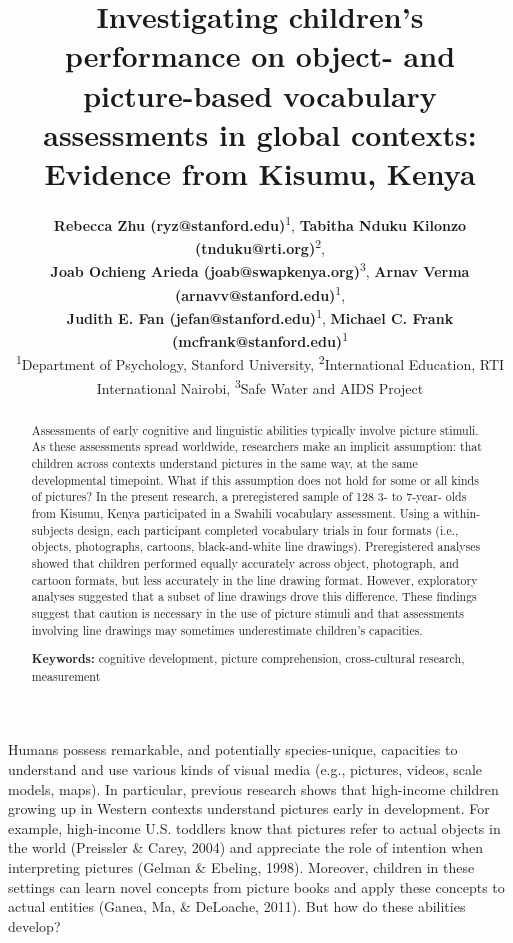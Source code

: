 \documentclass[10pt, letterpaper]{article}
\title{Investigating children's performance on object- and picture-based
vocabulary assessments in global contexts: Evidence from Kisumu, Kenya}
\author{ {\large \bf Rebecca Zhu (ryz@stanford.edu)}\textsuperscript{1}, {\large \bf Tabitha Nduku Kilonzo (tnduku@rti.org)}\textsuperscript{2}, \\ {\large \bf Joab Ochieng Arieda (joab@swapkenya.org)}\textsuperscript{3},  {\large \bf Arnav Verma (arnavv@stanford.edu)}\textsuperscript{1}, \\ {\large \bf Judith E. Fan (jefan@stanford.edu)}\textsuperscript{1}, {\large \bf Michael C. Frank (mcfrank@stanford.edu)}\textsuperscript{1}
 \\ \textsuperscript{1}Department of Psychology, Stanford University, \textsuperscript{2}International Education, RTI International Nairobi,
 \textsuperscript{3}Safe Water and AIDS Project}
\begin{document}
\maketitle

\begin{abstract}
Assessments of early cognitive and linguistic abilities typically
involve picture stimuli. As these assessments spread worldwide,
researchers make an implicit assumption: that children across contexts
understand pictures in the same way, at the same developmental
timepoint. What if this assumption does not hold for some or all kinds
of pictures? In the present research, a preregistered sample of 128 3-
to 7-year- olds from Kisumu, Kenya participated in a Swahili vocabulary
assessment. Using a within-subjects design, each participant completed
vocabulary trials in four formats (i.e., objects, photographs, cartoons,
black-and-white line drawings). Preregistered analyses showed that
children performed equally accurately across object, photograph, and
cartoon formats, but less accurately in the line drawing format.
However, exploratory analyses suggested that a subset of line drawings
drove this difference. These findings suggest that caution is necessary
in the use of picture stimuli and that assessments involving line
drawings may sometimes underestimate children's capacities.

\textbf{Keywords:}
cognitive development, picture comprehension, cross-cultural research,
measurement
\end{abstract}

Humans possess remarkable, and potentially species-unique, capacities to
understand and use various kinds of visual media (e.g., pictures,
videos, scale models, maps). In particular, previous research shows that
high-income children growing up in Western contexts understand pictures
early in development. For example, high-income U.S. toddlers know that
pictures refer to actual objects in the world (Preissler \& Carey, 2004)
and appreciate the role of intention when interpreting pictures (Gelman
\& Ebeling, 1998). Moreover, children in these settings can learn novel
concepts from picture books and apply these concepts to actual entities
(Ganea, Ma, \& DeLoache, 2011). But how do these abilities develop?
\end{document}
